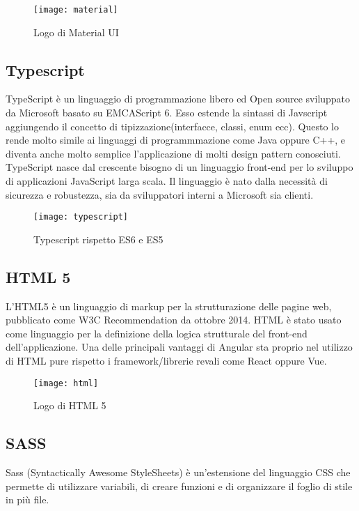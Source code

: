 \begin{figure}[!h] 
	\centering 
	\texttt{[image: material]}
	\caption{Logo di Material UI} 
\end{figure}


\subsection{Typescript} TypeScript è un linguaggio di programmazione libero ed Open source sviluppato da Microsoft basato su EMCAScript 6. Esso estende la sintassi di Javscript aggiungendo il concetto di tipizzazione(interfacce, classi, enum ecc). Questo lo rende molto simile ai linguaggi di programmmazione come Java oppure C++, e diventa anche molto semplice l'applicazione di molti design pattern conosciuti.
\\

 TypeScript nasce dal crescente bisogno di un linguaggio front-end per lo sviluppo di applicazioni JavaScript larga scala. Il linguaggio è nato dalla necessità di sicurezza e robustezza, sia da sviluppatori interni a Microsoft sia clienti. 
\begin{figure}[!h] 
	\centering 
	\texttt{[image: typescript]} 
	\caption{Typescript rispetto ES6 e ES5}
\end{figure}


\subsection{HTML 5} L'HTML5 è un linguaggio di markup per la strutturazione delle pagine web, pubblicato come W3C Recommendation da ottobre 2014. HTML è stato usato come linguaggio per la definizione della logica strutturale del
front-end dell’applicazione. Una delle principali vantaggi di Angular sta proprio nel utilizzo di HTML pure rispetto i framework/librerie revali come React oppure Vue. 
\begin{figure}[!h] 
	\centering 
	\texttt{[image: html]} 
	\caption{Logo di HTML 5}
\end{figure}

\subsection{SASS} Sass (Syntactically Awesome StyleSheets) è un'estensione del linguaggio CSS che permette di utilizzare variabili, di creare funzioni e di organizzare il foglio di stile in più file.
\\

